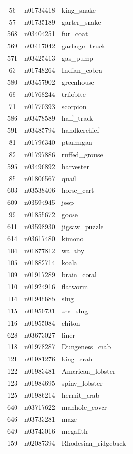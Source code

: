 \begin{table}
\begin{tabular}{cll}
56 & n01734418 & king_snake \\
57 & n01735189 & garter_snake \\
568 & n03404251 & fur_coat \\
569 & n03417042 & garbage_truck \\
571 & n03425413 & gas_pump \\
63 & n01748264 & Indian_cobra \\
580 & n03457902 & greenhouse \\
69 & n01768244 & trilobite \\
71 & n01770393 & scorpion \\
586 & n03478589 & half_track \\
591 & n03485794 & handkerchief \\
81 & n01796340 & ptarmigan \\
82 & n01797886 & ruffed_grouse \\
595 & n03496892 & harvester \\
85 & n01806567 & quail \\
603 & n03538406 & horse_cart \\
609 & n03594945 & jeep \\
99 & n01855672 & goose \\
611 & n03598930 & jigsaw_puzzle \\
614 & n03617480 & kimono \\
104 & n01877812 & wallaby \\
105 & n01882714 & koala \\
109 & n01917289 & brain_coral \\
110 & n01924916 & flatworm \\
114 & n01945685 & slug \\
115 & n01950731 & sea_slug \\
116 & n01955084 & chiton \\
628 & n03673027 & liner \\
118 & n01978287 & Dungeness_crab \\
121 & n01981276 & king_crab \\
122 & n01983481 & American_lobster \\
123 & n01984695 & spiny_lobster \\
125 & n01986214 & hermit_crab \\
640 & n03717622 & manhole_cover \\
646 & n03733281 & maze \\
649 & n03743016 & megalith \\
159 & n02087394 & Rhodesian_ridgeback \\

\end{tabular}
\end{table}
